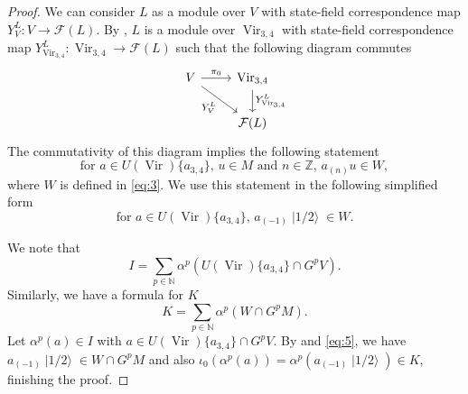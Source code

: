 \documentclass[a4paper, 12pt, reqno]{amsart}
\theoremstyle{remark}
\DeclareMathOperator{\Vir}{Vir}
\DeclareMathOperator{\vachalf}{|1/2\rangle}
\begin{document}
\begin{proof}
  We can consider $L$ as a module over $V$ with state-field correspondence map $Y^L_{V}: V \to \mathcal{F}(L)$.
  By \cite[Theorem 4.2]{wang_rationality_1993}, $L$ is a module over $\Vir_{3,4}$ with state-field correspondence map $Y^L_{\Vir_{3, 4}}: \Vir_{3, 4} \to \mathcal{F}(L)$ such that the following diagram commutes
  \begin{equation*}
    \begin{tikzcd}
      V \arrow[r, "\pi_0"] \arrow[rd, "{Y^{L}_{V}}"'] & {\Vir_{3, 4}} \arrow[d, "{Y^{L}_{\Vir_{3, 4}}}"] \\
      & {\mathcal{F}(L)}
    \end{tikzcd}
  \end{equation*}
  The commutativity of this diagram implies the following statement
  \begin{equation*}
    \text{for $a \in U(\Vir)\{a_{3, 4}\}$, $u \in M$ and $n \in \mathbb{Z}$, $a_{(n)}u \in W$},
  \end{equation*}
  where $W$ is defined in \eqref{eq:3}.
  We use this statement in the following simplified form
  \begin{equation}
    \label{eq:5}
    \text{for $a \in U(\Vir)\{a_{3, 4}\}$, $a_{(-1)}\vachalf \in W$}.
  \end{equation}

  We note that
  \begin{equation*}
    I = \sum_{p \in \mathbb{N}}\alpha^p(U(\Vir)\{a_{3, 4}\} \cap G^pV).
  \end{equation*}
  Similarly, we have a formula for $K$
  \begin{equation*}
    K = \sum_{p \in \mathbb{N}}\alpha^p(W \cap G^pM).
  \end{equation*}
  Let $\alpha^p(a) \in I$ with $a \in U(\Vir)\{a_{3, 4}\} \cap G^pV$.
  By  and \eqref{eq:5}, we have $a_{(-1)}\vachalf \in W \cap G^pM$ and also $\iota_0(\alpha^p(a)) = \alpha^p(a_{(-1)}\vachalf) \in K$, finishing the proof.
\end{proof}
\end{document}

